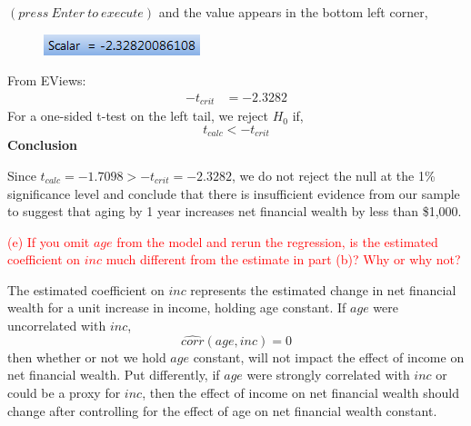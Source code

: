 \documentclass[12pt]{report}
\begin{document}
\vspace{-\baselineskip}\centering $(press\ Enter\ to\ execute)$
\justify and the value appears in the bottom left corner,
\begin{figure}[H]
	\centering
	\includegraphics{tute6_q3_7}
\end{figure}
\vspace{-\baselineskip}
\noindent From EViews: \begin{align*}
-t_{crit} &= -2.3282 
\end{align*}
\noindent For a one-sided t-test on the left tail, we reject $H_0$ if,
$$t_{calc} < -t_{crit}$$
\noindent \textbf{Conclusion}

\noindent Since $t_{calc} = -1.7098 > -t_{crit} = -2.3282$, we do not reject the null at the 1\% significance level and conclude that there is insufficient evidence from our sample to suggest that aging by 1 year increases net financial wealth by less than \$1,000.

\noindent \textcolor{red}{(e) If you omit $age$ from the model and rerun the regression, is the estimated coefficient on $inc$ much different from the estimate in part (b)? Why or why not?}

\noindent The estimated coefficient on $inc$ represents the estimated change in net financial wealth for a unit increase in income, holding age constant. If $age$ were uncorrelated with $inc$, $$\widehat{corr}(age,inc) = 0$$ then whether or not we hold $age$ constant, will not impact the effect of income on net financial wealth. Put differently, if $age$ were strongly correlated with $inc$ or could be a proxy for $inc$, then the effect of income on net financial wealth should change after controlling for the effect of age on net financial wealth constant.
\end{document}
